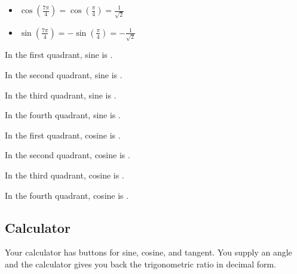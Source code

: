 \documentclass{ximera}
\begin{document}
\begin{itemize}
\item $\cos\left( \frac{7 \pi}{4} \right) = \cos\left( \frac{\pi}{4} \right) = \frac{1}{\sqrt{2}}$
\item $\sin\left( \frac{7 \pi}{4} \right) = -\sin\left( \frac{\pi}{4} \right) = -\frac{1}{\sqrt{2}}$
\end{itemize}








\begin{question} 

In the first quadrant, sine is . 

In the second quadrant, sine is . 

In the third quadrant, sine is . 

In the fourth quadrant, sine is . 

\end{question}








\begin{question} 

In the first quadrant, cosine is . 

In the second quadrant, cosine is . 

In the third quadrant, cosine is . 

In the fourth quadrant, cosine is . 

\end{question}











\subsection*{Calculator}

Your calculator has buttons for sine, cosine, and tangent. You supply an angle and the calculator gives you back the trigonometric ratio in decimal form.
\end{document}
